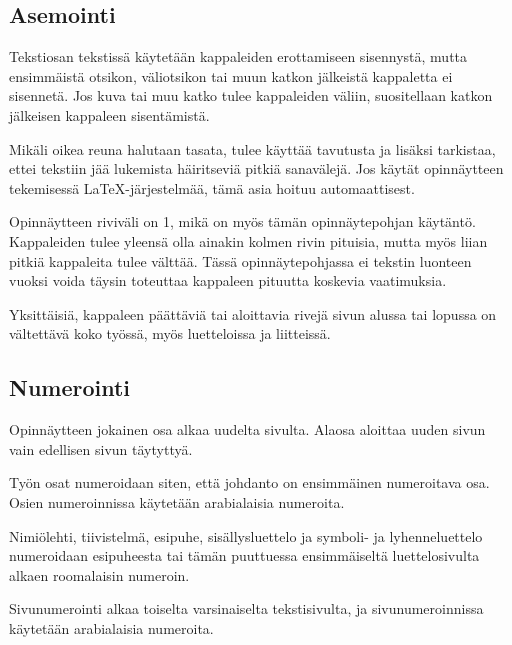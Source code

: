 \documentclass[english,12pt,a4paper,pdftex,elec,utf8]{aaltothesis}
\begin{document}
\subsection*{Asemointi}

Tekstiosan tekstiss\"a k\"aytet\"a\"an kappaleiden erottamiseen sisennyst\"a,
mutta ensimm\"aist\"a otsikon, v\"aliotsikon tai muun katkon j\"alkeist\"a
kappaletta ei sisennet\"a. Jos kuva tai muu katko tulee kappaleiden
v\"aliin, suositellaan katkon j\"alkeisen kappaleen sisent\"amist\"a.

Mik\"ali oikea reuna halutaan tasata, tulee k\"aytt\"a\"a tavutusta ja lis\"aksi
tarkistaa, ettei tekstiin j\"a\"a lukemista h\"airitsevi\"a pitki\"a sanav\"alej\"a. Jos
k\"ayt\"at opinn\"aytteen tekemisess\"a \LaTeX-j\"arjestelm\"a\"a,
t\"am\"a asia hoituu automaattisest.

Opinn\"aytteen riviv\"ali on 1, mik\"a on my\"os t\"am\"an opinn\"aytepohjan k\"ayt\"ant\"o.
Kappaleiden tulee yleens\"a olla ainakin kolmen rivin pituisia, mutta
my\"os liian pitki\"a kappaleita tulee v\"altt\"a\"a.  T\"ass\"a opinn\"aytepohjassa
ei tekstin luonteen vuoksi voida t\"aysin toteuttaa kappaleen pituutta koskevia
vaatimuksia.

Yksitt\"aisi\"a, kappaleen p\"a\"att\"avi\"a tai aloittavia rivej\"a sivun alussa
tai lopussa on v\"altett\"av\"a koko ty\"oss\"a, my\"os luetteloissa ja
liitteiss\"a.

\subsection*{Numerointi}

Opinn\"aytteen jokainen osa alkaa uudelta sivulta. Alaosa aloittaa uuden
sivun vain edellisen sivun t\"aytytty\"a.

Ty\"on osat numeroidaan siten, ett\"a johdanto on ensimm\"ainen numeroitava
osa. Osien numeroinnissa k\"aytet\"a\"an arabialaisia numeroita.

Nimi\"olehti, tiivistelm\"a, esipuhe, sis\"allysluettelo ja symboli- ja
lyhenneluettelo numeroidaan esipuheesta tai t\"am\"an puuttuessa
ensimm\"aiselt\"a luettelosivulta alkaen roomalaisin numeroin.

Sivunumerointi alkaa toiselta varsinaiselta tekstisivulta, ja
sivunumeroinnissa k\"aytet\"a\"an arabialaisia numeroita.
\end{document}
